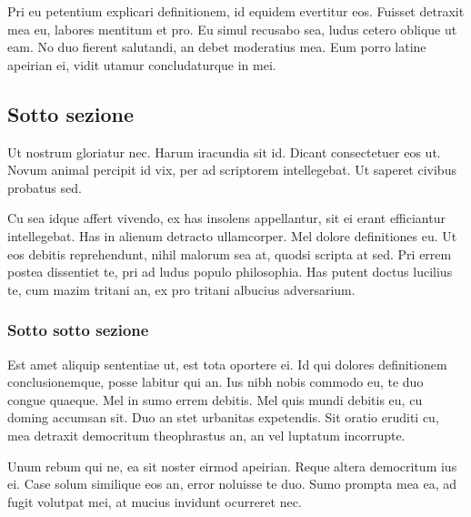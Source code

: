 \documentclass[11pt, a4paper, twoside, openright]{book}
\begin{document}
Pri eu petentium explicari definitionem, id equidem evertitur eos. Fuisset
detraxit mea eu, labores mentitum et pro. Eu simul recusabo sea, ludus cetero
oblique ut eam. No duo fierent salutandi, an debet moderatius mea. Eum porro
latine apeirian ei, vidit utamur concludaturque in mei.

\subsection{Sotto sezione}
Ut nostrum gloriatur nec. Harum iracundia sit id. Dicant consectetuer eos ut.
Novum animal percipit id vix, per ad scriptorem intellegebat. Ut saperet civibus
probatus sed.

Cu sea idque affert vivendo, ex has insolens appellantur, sit ei erant
efficiantur intellegebat. Has in alienum detracto ullamcorper. Mel dolore
definitiones eu. Ut eos debitis reprehendunt, nihil malorum sea at, quodsi
scripta at sed. Pri errem postea dissentiet te, pri ad ludus populo philosophia.
Has putent doctus lucilius te, cum mazim tritani an, ex pro tritani albucius
adversarium.

\subsubsection{Sotto sotto sezione}
Est amet aliquip sententiae ut, est tota oportere ei. Id qui dolores
definitionem conclusionemque, posse labitur qui an. Ius nibh nobis commodo eu,
te duo congue quaeque. Mel in sumo errem debitis. Mel quis mundi debitis eu, cu
doming accumsan sit. Duo an stet urbanitas expetendis. Sit oratio eruditi cu,
mea detraxit democritum theophrastus an, an vel luptatum incorrupte.

Unum rebum qui ne, ea sit noster eirmod apeirian. Reque altera democritum ius
ei. Case solum similique eos an, error noluisse te duo. Sumo prompta mea ea, ad
fugit volutpat mei, at mucius invidunt ocurreret nec.
\end{document}
